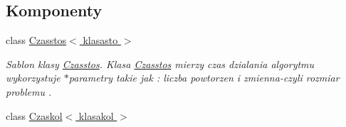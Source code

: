 \subsection*{Komponenty}
\begin{DoxyCompactItemize}
\item 
class \hyperlink{class_czasstos}{Czasstos$<$ klasasto $>$}
\begin{DoxyCompactList}\small\item\em Sablon klasy \hyperlink{class_czasstos}{Czasstos}. Klasa \hyperlink{class_czasstos}{Czasstos} mierzy czas dzialania algorytmu wykorzystuje $\ast$parametry takie jak \-: liczba powtorzen i zmienna-\/czyli rozmiar problemu . \end{DoxyCompactList}\item 
class \hyperlink{class_czaskol}{Czaskol$<$ klasakol $>$}
\end{DoxyCompactItemize}
